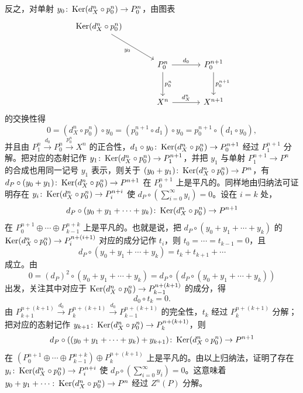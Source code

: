 
反之，对单射 $y_0\colon\operatorname{Ker}(d_X^n\circ p_0^n)\to P_0^n$，由图表
\[\begin{tikzcd}[row sep=2.8em, column sep=3.4em]
\Ker(d_X^n\circ p_0^n) \arrow[dr,"y_0"'] \\
 & P_0^n \arrow[r,"d_0"] \arrow[d,"p_0^n"] & P_0^{n+1} \arrow[d,"p_0^{n+1}"]\\
 & X^n \arrow[r,"d_X^n"] & X^{n+1}
\end{tikzcd}\]
的交换性得
\[
  0=(d_X^n\circ p_0^n)\circ y_0=(p_0^{n+1}\circ d_1)\circ y_0=p_0^{n+1}\circ(d_1\circ y_0),
\]
并且由 $P_1^n\xrightarrow{d_0}P_0^n\xrightarrow{p_0^n}X^n$ 的正合性，$d_1\circ y_0\colon\operatorname{Ker}(d_X^n\circ p_0^n)\to P_0^{n+1}$ 经过 $P_1^{n+1}$ 分解。把对应的态射记作 $y_1\colon\operatorname{Ker}(d_X^n\circ p_0^n)\to P_1^{n+1}$，并把 $y_1$ 与单射 $P_1^{n+1}\to P^n$ 的合成也用同一记号 $y_1$ 表示，则关于 $(y_0+y_1)\colon\operatorname{Ker}(d_X^n\circ p_0^n)\to P^n$，有
$d_P\circ(y_0+y_1)\colon\operatorname{Ker}(d_X^n\circ p_0^n)\to P^{n+1}$
在 $P_0^{n+1}$ 上是平凡的。同样地由归纳法可证明存在 $y_i\colon\operatorname{Ker}(d_X^n\circ p_0^n)\to P_i^{n+i}$ 使 $d_P\circ(\sum_{i=0}^\infty y_i)=0$。设在 $i=k$ 处，
\[
  d_P\circ(y_0+y_1+\cdots+y_k)\colon\operatorname{Ker}(d_X^n\circ p_0^n)\to P^{n+1}
\]
在 $P_0^{n+1}\oplus\cdots\oplus P_{k-1}^{n+k}$ 上是平凡的。也就是说，把 $d_P\circ(y_0+y_1+\cdots+y_k)$ 的 $\operatorname{Ker}(d_X^n\circ p_0^n)\to P_i^{n+(i+1)}$ 对应的成分记作 $t_i$，则 $t_0=\cdots=t_{k-1}=0$，且
\[
  d_P\circ(y_0+y_1+\cdots+y_k)=t_k+t_{k+1}+\cdots
\]
成立。由
\[
  0=(d_P)^2\circ(y_0+y_1+\cdots+y_k)=d_P\circ(d_P\circ(y_0+y_1+\cdots+y_k))
\]
出发，关注其中对应于 $\operatorname{Ker}(d_X^n\circ p_0^n)\to P_{k-1}^{n+(k+1)}$ 的成分，得
\[
  d_0\circ t_k=0.
\]
由 $P_{k+1}^{n+(k+1)}\xrightarrow{d_0}P_k^{n+(k+1)}\xrightarrow{d_0}P_{k-1}^{n+(k+1)}$ 的完全性，$t_k$ 经过 $P_k^{n+(k+1)}$ 分解；把对应的态射记作 $y_{k+1}\colon\operatorname{Ker}(d_X^n\circ p_0^n)\to P_k^{n+(k+1)}$，则
\[
  d_P\circ((y_0+y_1+\cdots+y_k)+y_{k+1})\colon\operatorname{Ker}(d_X^n\circ p_0^n)\to P^{n+1}
\]
在 $(P_0^{n+1}\oplus\cdots\oplus P_{k-1}^{n+k})\oplus P_k^{n+(k+1)}$ 上是平凡的。由以上归纳法，证明了存在 $y_i\colon\operatorname{Ker}(d_X^n\circ p_0^n)\to P_i^{n+i}$ 使 $d_P\circ(\sum_{i=0}^\infty y_i)=0$。这意味着 $y_0+y_1+\cdots\colon\operatorname{Ker}(d_X^n\circ p_0^n)\to P^n$ 经过 $Z^n(P)$ 分解。

